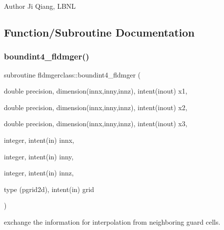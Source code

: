 \begin{DoxyAuthor}{Author}
Ji Qiang, L\+B\+NL 
\end{DoxyAuthor}


\subsection{Function/\+Subroutine Documentation}
\mbox{\label{namespacefldmgerclass_a490fceb1792fb1664488b1394dcff5f0}} 
\subsubsection{\texorpdfstring{boundint4\_fldmger()}{boundint4\_fldmger()}}
{\footnotesize\ttfamily subroutine fldmgerclass\+::boundint4\+\_\+fldmger (\begin{DoxyParamCaption}\item[{double precision, dimension(innx,inny,innz), intent(inout)}]{x1,  }\item[{double precision, dimension(innx,inny,innz), intent(inout)}]{x2,  }\item[{double precision, dimension(innx,inny,innz), intent(inout)}]{x3,  }\item[{integer, intent(in)}]{innx,  }\item[{integer, intent(in)}]{inny,  }\item[{integer, intent(in)}]{innz,  }\item[{type (pgrid2d), intent(in)}]{grid }\end{DoxyParamCaption})}



exchange the information for interpolation from neighboring guard cells. 

